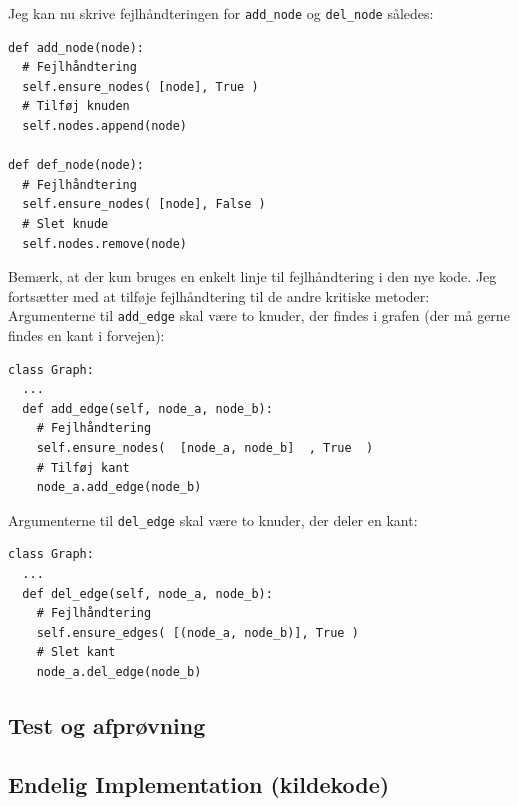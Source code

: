 \documentclass[10pt,a4paper,danish]{article}
\newcommand{\ct}{\texttt}
\begin{document}
Jeg kan nu skrive fejlhåndteringen for \ct{add\_node} og \ct{del\_node}
således:

{\small
\begin{verbatim}
def add_node(node):
  # Fejlhåndtering
  self.ensure_nodes( [node], True )
  # Tilføj knuden
  self.nodes.append(node)

def def_node(node):
  # Fejlhåndtering
  self.ensure_nodes( [node], False )
  # Slet knude
  self.nodes.remove(node)
\end{verbatim}}

Bemærk, at der kun bruges en enkelt linje til fejlhåndtering i den nye
kode. Jeg fortsætter med at tilføje fejlhåndtering til de andre
kritiske metoder: \\

Argumenterne til \ct{add\_edge} skal være to knuder, der findes i
grafen (der må gerne findes en kant i forvejen):
{\small
\begin{verbatim}
class Graph:
  ...
  def add_edge(self, node_a, node_b):
    # Fejlhåndtering
    self.ensure_nodes(  [node_a, node_b]  , True  )
    # Tilføj kant
    node_a.add_edge(node_b)
\end{verbatim}}

Argumenterne til \ct{del\_edge} skal være to knuder, der deler en
kant:
{\small
\begin{verbatim}
class Graph:
  ...
  def del_edge(self, node_a, node_b):
    # Fejlhåndtering
    self.ensure_edges( [(node_a, node_b)], True )
    # Slet kant
    node_a.del_edge(node_b)
\end{verbatim}}


\subsection{Test og afprøvning}


\subsection{Endelig Implementation (kildekode)}
\begin{alltt}

\end{alltt}
\end{document}

